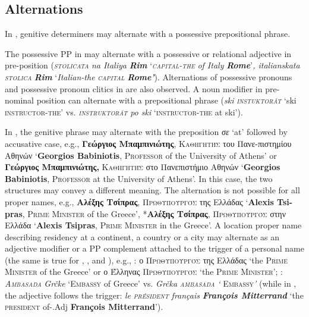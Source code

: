 \documentclass[output=paper]{langsci/langscibook}
\newcommand{\trigger}[1]{\textsc{#1}}
\begin{document}
\subsection{Alternations} %

In , genitive determiners may alternate with a possessive
prepositional phrase.

The possessive PP in  may alternate with a possessive or
relational adjective in pre-position (\textit{\trigger{stolicata}}
\textit{na Italiya} \textbf{\textit{Rim}} ‘\textit{\trigger{capital-the}}
\textit{of Italy }\textbf{\textit{Rome}}’\textit{, italianskata}\trigger{
}\textit{\trigger{stolica}} \textbf{\textit{Rim}} ‘\textit{Italian-the
}\textit{\trigger{capital}} \textbf{\textit{Rome’}}). Alternations of
possessive pronouns and possessive pronoun clitics in  are
also observed. A noun modifier in pre-nominal position can alternate
with a prepositional phrase (\textit{ski }\textit{\trigger{instuktorăt}}
`ski \trigger{instructor-the}' vs. \textit{\trigger{instruktorăt}}
\textit{po ski }`\trigger{instructor-the} at ski').



In , the genitive phrase may alternate with the preposition
\textit{σε} ‘at’ followed by accusative case, e.g.,
\textbf{Γεώργιος Μπαμπινιώτης},
\trigger{Καθηγητής} του Πανε-πιστημίου Αθηνών
‘\textbf{Georgios Babiniotis}, \trigger{Professor} of the University of
Athens’ or \textbf{Γεώργιος Μπαμπινιώτης,}
\trigger{Καθηγητής} στο Πανεπιστήμιο Αθηνών ‘\textbf{Georgios Babiniotis}, \trigger{Professor} at the University of
Athens’. In this case, the two structures may convey a different
meaning. The alternation is not possible for all proper names, e.g.,
\textbf{Αλέξης Τσίπρας},
\trigger{Πρωθυπουργός} της Ελλάδας ‘\textbf{Alexis
Tsi-} \textbf{pras}, \trigger{Prime} \trigger{Minister} of the Greece’,
*\textbf{Αλέξης Τσίπρας},
\trigger{Πρωθυπουργός} στην Ελλάδα ‘\textbf{Alexis
Tsipras}, \trigger{Prime Minister} in the Greece’. A location proper name
describing residency at a continent, a country or a city may alternate
as an adjective modifier or a PP complement attached to the trigger of
a personal name (the same is true for , , and ),
e.g., : ο \trigger{Πρωθυπουργός} της Ελλάδας
‘the \trigger{Prime Minister} of the Greece’ or ο Έλληνας
\trigger{Πρωθυπουργός} ‘the  \trigger{Prime Minister}’; :
\textit{\trigger{Ambasada}} \textit{Grčke} ‘\trigger{Embassy} of Greece’
vs. \textit{Grčka }\textit{\trigger{ambasada}}\textit{ ‘}
\trigger{Embassy}\textit{’} (while in , the adjective follows the
trigger:\textit{ le }\textit{\trigger{président}}\textit{ français
}\textbf{\textit{François Mitterrand}} ‘the \trigger{president}
of-.Adj \textbf{François Mitterrand}’).
\end{document}
